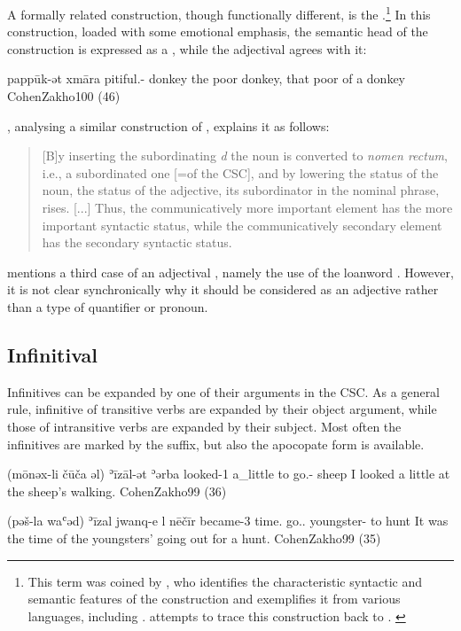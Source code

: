 A formally related construction, though functionally different, is the .\footnote{This term was coined by \citet{HopkinsEmotive}, who identifies the characteristic syntactic and semantic features of the construction and exemplifies it from various  languages, including .  \citet{GaiRare} attempts to trace this construction back to \Akk. \label{ft:emotive_genitive}} In this construction, loaded with some emotional emphasis, the semantic head of the construction is expressed as a \secn, while the adjectival \prim agrees with it:

{pappūk-ət xmāra}
{pitiful.\masc-\cst{} donkey}
{the poor donkey, that poor of a donkey}
{CohenZakho}{100 (46)}

\citet[270]{GaiHighLoad}, analysing a similar construction of \CUrm, explains it as follows: \blockquote{[B]y inserting the subordinating \textit{d}
the noun is converted to \textit{nomen rectum}, i.e., a subordinated
one [=\secn of the CSC], and by lowering the status of the noun, the
status of the adjective, its subordinator in the nominal
phrase, rises. [...] Thus, the communicatively more important element
has the more important syntactic status, while the communicatively
secondary element has the secondary syntactic
status.}

\citet[101]{CohenZakho} mentions a third case of an adjectival \prim, namely the use of the \Arab loanword . However, it is not clear synchronically why it should be considered as an adjective rather than a type of quantifier or pronoun. 

\subsection{Infinitival \prims} \label{ss:JZax_inf_head}
Infinitives  can be expanded by one of their arguments in the CSC. As a general rule, infinitive of transitive verbs are expanded by their object argument, while those of intransitive verbs are expanded by their subject. Most often the infinitives are marked by the \cst* suffix, but also the apocopate form is available.

{(mōnəx-li čūča əl) ʾīzāl-ət ʾərba}
{looked-1\sg{} a\_little to go.\inf-\cst{} sheep}
{I looked a little at the  sheep's walking.}
{CohenZakho}{99 (36)}

\largerpage
{}
{(pəš-la waʿəd) ʾīzal jwanq-e l\cb{} nēčīr}
{became-3\fem{} time.\cst{} go.\inf.\cst{} youngster-\pl{} to\cb{} hunt}
{It was the time of the youngsters’ going out for a hunt.}
{CohenZakho}{99 (35)}\antipar\newpage 


